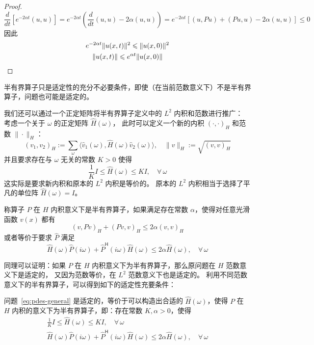 \begin{proof}
    \[
        \frac{d}{dt} \left[ e^{-2\alpha  t}(u,u) \right]
        =e^{-2\alpha t}(\frac{d}{dt}(u,u)-2\alpha (u,u))
        = e^{-2 \alpha t}\left[(u ,P u) + (P u,u) - 2\alpha (u,u)\right] \le 0
    \]
    因此
    \begin{gather*}
        e^{-2\alpha t} \| u(x,t) \|^2 \le  \| u(x,0) \|^2 \\
        \| u(x,t) \| \le e^{\alpha t}\| u(x,0) \| \qedhere
    \end{gather*}
\end{proof}

\begin{remark}
    半有界算子只是适定性的充分不必要条件，即使（在当前范数意义下）不是半有界算子，问题也可能是适定的。
\end{remark}

我们还可以通过一个正定矩阵将半有界算子定义中的 $L^2$ 内积和范数进行推广：
考虑一个关于 $\omega $ 的正定矩阵 $\widehat{H}(\omega)$，
此时可以定义一个新的内积 $(\cdot,\cdot)_H$ 和范数 $\| \cdot \|_H$：
\[
    (v_1,v_2)_H := \sum_\omega \langle\hat{v}_1(\omega),\widehat{H}(\omega)\hat{v}_2(\omega)\rangle,\quad
    \| v \|_H := \sqrt{(v,v)_H}
\]
并且要求存在与 $\omega $ 无关的常数 $K>0$ 使得
\[
    \frac{1}{K}I \le \widehat{H}(\omega ) \le K I,\quad \forall\,\omega
\]
这实际是要求新内积和原本的 $L^2$ 内积是等价的。
原本的 $L^2$ 内积相当于选择了平凡的单位阵 $\widehat{H}(\omega ) = I$。

\begin{definition}
    称算子 $P$ 在 $H$ 内积意义下是半有界算子，如果满足存在常数 $\alpha$，使得对任意光滑函数 $v(x)$ 都有
    \[
        (v,Pv)_H + (Pv,v)_H \le 2\alpha (v,v)_H
    \]
    或者等价于要求 $\widehat{P}$ 满足
    \[
        \widehat{H}(\omega ) \widehat{P}(i \omega) + \widehat{P}^{\mathsf{H}}(i \omega) \widehat{H}(\omega ) \le 2\alpha \widehat{H}(\omega ),\quad \forall\,\omega
    \]
\end{definition}
同理可以证明：如果 $P$ 在 $H$ 内积意义下为半有界算子，那么原问题在 $H$ 范数意义下是适定的，
又因为范数等价，在 $L^2$ 范数意义下也是适定的。
利用不同范数意义下的半有界算子，可以得到如下的适定性充要条件：

\begin{theorem}\label{thm:well-posed-7}
    问题~\eqref{eq:pdes-general} 是适定的，等价于可以构造出合适的 $\widehat{H}(\omega )$，使得 $P$ 在 $H$ 内积的意义下为半有界算子，即：存在常数 $K,\alpha >0$，使得
    \begin{gather}
        \frac{1}{K}I \le \widehat{H}(\omega ) \le K I, \quad \forall\,\omega  \label{eq:well-posed-condition-1}\\
        \widehat{H}(\omega ) \widehat{P}(i \omega) + \widehat{P}^{\mathsf{H}}(i \omega) \widehat{H}(\omega ) \le 2\alpha \widehat{H}(\omega ),\quad \forall\,\omega \label{eq:well-posed-condition-2}
    \end{gather}
\end{theorem}


